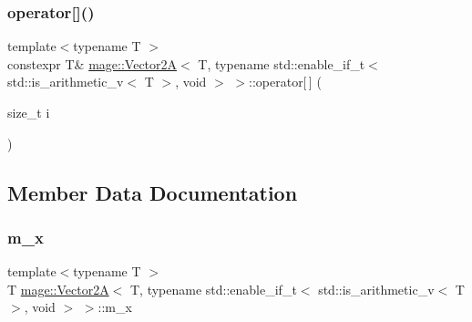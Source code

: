 \subsubsection{\texorpdfstring{operator[]()}{operator[]()}\hspace{0.1cm}{\footnotesize\ttfamily [2/2]}}
{\footnotesize\ttfamily template$<$typename T $>$ \\
constexpr T\& \hyperlink{structmage_1_1_vector2_a}{mage\+::\+Vector2A}$<$ T, typename std\+::enable\+\_\+if\+\_\+t$<$ std\+::is\+\_\+arithmetic\+\_\+v$<$ T $>$, void $>$ $>$\+::operator\mbox{[}$\,$\mbox{]} (\begin{DoxyParamCaption}\item[{size\+\_\+t}]{i }\end{DoxyParamCaption})\hspace{0.3cm}{\ttfamily [noexcept]}}



\subsection{Member Data Documentation}
\hypertarget{structmage_1_1_vector2_a_3_01_t_00_01typename_01std_1_1enable__if__t_3_01std_1_1is__arithmetic__b421e7a25afc1ac5972d3b452777021a_a0e0f036dcea7ca953e4007c5b67578bf}{}\label{structmage_1_1_vector2_a_3_01_t_00_01typename_01std_1_1enable__if__t_3_01std_1_1is__arithmetic__b421e7a25afc1ac5972d3b452777021a_a0e0f036dcea7ca953e4007c5b67578bf} 
\subsubsection{\texorpdfstring{m\+\_\+x}{m\_x}}
{\footnotesize\ttfamily template$<$typename T $>$ \\
T \hyperlink{structmage_1_1_vector2_a}{mage\+::\+Vector2A}$<$ T, typename std\+::enable\+\_\+if\+\_\+t$<$ std\+::is\+\_\+arithmetic\+\_\+v$<$ T $>$, void $>$ $>$\+::m\+\_\+x}

